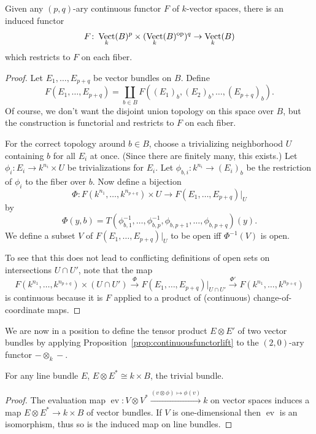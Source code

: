 \documentclass[a4paper,openany]{scrbook}
\DeclareMathOperator{\Vect}{Vect}
\begin{document}
\begin{prop}\label{prop:continuousfunctorlift}
Given any $(p,q)$-ary continuous functor $F$ of $k$-vector spaces, there is an induced functor
\[
F\colon \Vect_k(B)^p \times (\Vect_k(B)^\op)^q \to \Vect_k(B)
\]
which restricts to $F$ on each fiber.
\end{prop}
\begin{proof}
Let $E_1,\dots,E_{p+q}$ be vector bundles on $B$. Define
\[
F(E_1,\dots,E_{p+q}) = \coprod_{b \in B} F((E_1)_b,(E_2)_b,\dots,(E_{p+q})_b).
\]
Of course, we don't want the disjoint union topology on this space over $B$, but the construction is functorial and restricts to $F$ on each fiber.

For the correct topology around $b \in B$, choose a trivializing neighborhood $U$ containing $b$ for all $E_i$ at once. (Since there are finitely many, this exists.) Let $\phi_i\colon E_i \to k^{n_i} \times U$ be trivializations for $E_i$. Let $\phi_{b,i}\colon k^{n_i} \to (E_i)_b$ be the restriction of $\phi_i$ to the fiber over $b$. Now define a bijection
\[
\Phi\colon F(k^{n_1},\dots,k^{n_{p+q}}) \times U \to F(E_1,\dots,E_{p+q})|_U
\]
by
\[
\Phi(y,b) = T(\phi_{b,1}^{-1},\dots,\phi_{b,p}^{-1},\phi_{b,p+1},\dots,\phi_{b,p+q})(y).
\]
We define a subset $V$ of $F(E_1,\dots,E_{p+q})|_U$ to be open iff $\Phi^{-1}(V)$ is open.

To see that this does not lead to conflicting definitions of open sets on intersections $U \cap U'$, note that the map
\[
F(k^{n_1},\dots,k^{n_{p+q}}) \times (U \cap U') \xrightarrow{\Phi} F(E_1,\dots,E_{p+q})|_{U\cap U'} \xrightarrow{\Phi'} F(k^{n_1},\dots,k^{n_{p+q}})
\]
is continuous because it is $F$ applied to a product of (continuous) change-of-coordinate maps.
\end{proof}

We are now in a position to define the tensor product $E \otimes E'$ of two vector bundles by applying Proposition~\ref{prop:continuousfunctorlift} to the $(2,0)$-ary functor $- \otimes_k -$.

\begin{lemma}
For any line bundle $E$, $E \otimes E^* \cong k \times B$, the trivial bundle.
\end{lemma}
\begin{proof}
The evaluation map $\operatorname{ev}\colon V \otimes V^* \xrightarrow{(v \otimes \phi) \mapsto \phi(v)} k$ on vector spaces induces a map $E \otimes E^* \to k \times B$ of vector bundles. If $V$ is one-dimensional then $\operatorname{ev}$ is an isomorphism, thus so is the induced map on line bundles.
\end{proof}
\end{document}
